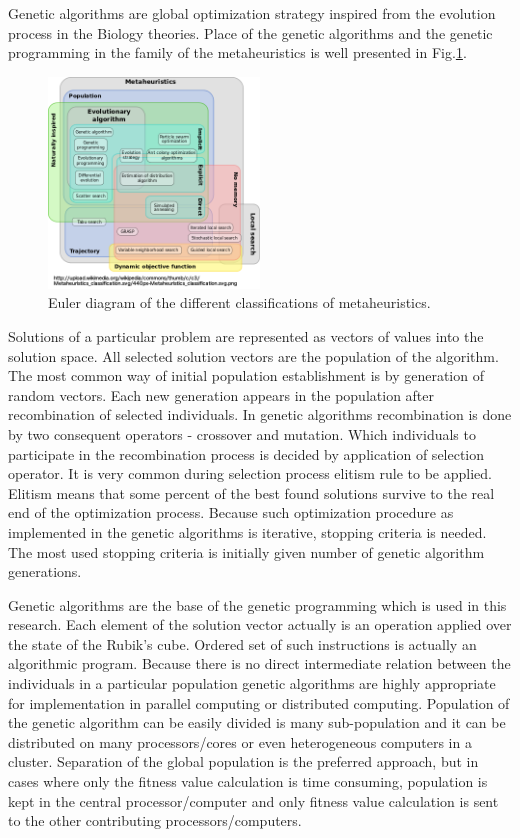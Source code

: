 \documentclass[runningheads]{llncs}
\begin{document}
Genetic algorithms are global optimization strategy inspired from the evolution process in the Biology theories. Place of the genetic algorithms and the genetic programming in the family of the metaheuristics is well presented in Fig.\ref{fig02}.

\begin{figure}
\includegraphics[width=0.5\textwidth]{fig02.png}
\centering
\caption{Euler diagram of the different classifications of metaheuristics.} \label{fig02}
\end{figure}
\FloatBarrier

Solutions of a particular problem are represented as vectors of values into the solution space. All selected solution vectors are the population of the algorithm. The most common way of initial population establishment is by generation of random vectors. Each new generation appears in the population after recombination of selected individuals. In genetic algorithms recombination is done by two consequent operators - crossover and mutation. Which individuals to participate in the recombination process is decided by application of selection operator. It is very common during selection process elitism rule to be applied. Elitism means that some percent of the best found solutions survive to the real end of the optimization process. Because such optimization procedure as implemented in the genetic algorithms is iterative, stopping criteria is needed. The most used stopping criteria is initially given number of genetic algorithm generations. 

Genetic algorithms are the base of the genetic programming which is used in this research. Each element of the solution vector actually is an operation applied over the state of the Rubik's cube. Ordered set of such instructions is actually an algorithmic program. Because there is no direct intermediate relation between the individuals in a particular population genetic algorithms are highly appropriate for implementation in parallel computing or distributed computing. Population of the genetic algorithm can be easily divided is many sub-population and it can be distributed on many processors/cores or even heterogeneous computers in a cluster. Separation of the global population is the preferred approach, but in cases where only the fitness value calculation is time consuming, population is kept in the central processor/computer and only fitness value calculation is sent to the other contributing processors/computers. 
\end{document}
